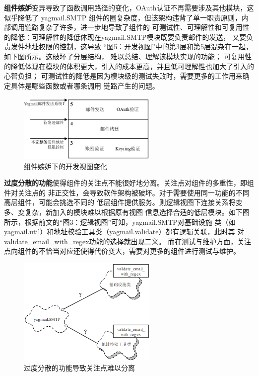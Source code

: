 \documentclass[UTF8,12pt,a4paper]{ctexart}
\begin{document}
    \textbf{组件嫉妒}变异导致了函数调用路径的变化，OAuth认证不再需要涉及其他模块，这似乎降低了
    yagmail.SMTP
    组件的圈复杂度，但该架构违背了单一职责原则，内部调用链路复杂了许多，进一步地导致了组件的
    可测试性、可理解性和可复用性的降低：可理解性的降低体现在yagmail.SMTP模块既要负责邮件的发送，
    又要负责发件地址权限的控制，这导致
    “图5：开发视图”中的第3层和第5层混杂在一起，如下图所示。这破坏了分层结构，
    难以总结、理解该模块实现的功能；
    可复用性的降低体现在模块的体积更大，引入的成本更高，并且低可理解性也加大了引入的心智负担；
    可测试性的降低是因为模块级的测试失败时，需要更多的工作用来确定具体是哪些函数或者哪条调用
    链路产生的问题。
    
    \begin{figure}[H]
        \centering
        \includegraphics[width=0.6\textwidth]{figure/changed-dev-view.png}
        \caption{组件嫉妒下的开发视图变化}
        \label{fig:changed-dev-view}
    \end{figure}
    
    \textbf{过度分散的功能}使得组件的关注点不能很好地分离。关注点对组件的多重性，即组件对关注点的
    非正交性，会导致软件架构被破坏。对于需要使用同一功能的不同高层组件，可能会挑选不同的
    低层组件提供服务。则逻辑视图下连接关系将变多、变复杂，新加入的模块难以根据原有视图
    信息选择合适的低层模块。如下图所示，根据前文的“图3：逻辑视图”可知，yagmail.SMTP对基础设施
    类（如yagmail.util）和地址校验工具类（yagmail.validate）都有逻辑关联，此时其
    对validate\_email\_with\_regex功能的选择就出现二义。
    而在测试与维护方面，关注点向组件的不恰当对应还使得代价变大，需要对更多的组件进行测试与维护。

    \begin{figure}[H]
        \centering
        \includegraphics[width=0.6\textwidth]{figure/changed-log-view.png}
        \caption{过度分散的功能导致关注点难以分离}
        \label{fig:changed-log-view}
    \end{figure}
    
\end{document}
